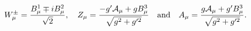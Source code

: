 \begin{equation}
   W^\pm_\mu=\frac{B^1_\mu \mp i B^2_\mu}{\sqrt{2}}, \quad
   Z_\mu=\frac{-g'{\cal A}_\mu+gB^3_\mu}{\sqrt{g^2+g'^2}}
\quad \mbox{and} \quad
   {A}_\mu=\frac{g{\cal A}_\mu+g' B^3_\mu}{\sqrt{g^2+g'^2}}.
\end{equation}

